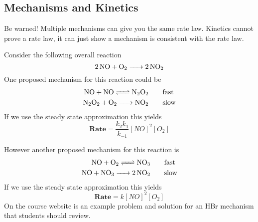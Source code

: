 \documentclass{article}
\newcommand{\be}{\begin{equation}}
\newcommand{\ee}{\end{equation}}
\begin{document}
\subsection{Mechanisms and Kinetics}
Be warned! Multiple mechanisms can give you the same rate law. 
Kinetics cannot prove a rate law, it can just show a mechanism is consistent with the rate law. 

Consider the following overall reaction
\be
\ce{2NO + O2 -> 2NO2}
\ee
One proposed mechanism for this reaction could be 
\be
\begin{split}
    \ce{NO + NO <=> N2O2}& \qquad \text{fast}\\
        \ce{N2O2 + O2 -> NO2}& \qquad \text{slow}\\
\end{split}
\ee
If we use the steady state approximation this yields
\be
\textbf{Rate} = \frac{k_2k_1}{k_{-1}}[NO]^2[O_2]
\ee

However another proposed mechanism for this reaction is
\be
\begin{split}
    \ce{NO + O2 <=> NO3}& \qquad \text{fast}\\
    \ce{NO + NO3 -> 2NO2}& \qquad \text{slow}\\
\end{split}
\ee
If we use the steady state approximation this yields
\be
\textbf{Rate} = k[NO]^2[O_2]
\ee
On the course website is an example problem and solution for an HBr mechanism that students should review. 
 
\end{document}
